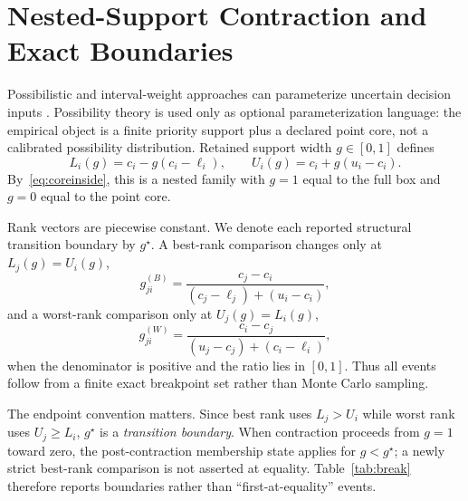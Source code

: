 \documentclass[conference]{IEEEtran}
\begin{document}
\section{Nested-Support Contraction and Exact Boundaries}
Possibilistic and interval-weight approaches can parameterize uncertain decision inputs \cite{kasperski2010,dubois2016}. Possibility theory is used only as optional parameterization language: the empirical object is a finite priority support plus a declared point core, not a calibrated possibility distribution. Retained support width $g\in[0,1]$ defines
\begin{equation}
L_i(g)=c_i-g(c_i-\ell_i),\qquad U_i(g)=c_i+g(u_i-c_i).
\label{eq:contract}
\end{equation}
By~\eqref{eq:coreinside}, this is a nested family with $g=1$ equal to the full box and $g=0$ equal to the point core.

Rank vectors are piecewise constant. We denote each reported structural transition boundary by $g^\star$. A best-rank comparison changes only at $L_j(g)=U_i(g)$,
\begin{equation}
g_{ji}^{(B)}=\frac{c_j-c_i}{(c_j-\ell_j)+(u_i-c_i)},
\end{equation}
and a worst-rank comparison only at $U_j(g)=L_i(g)$,
\begin{equation}
g_{ji}^{(W)}=\frac{c_i-c_j}{(u_j-c_j)+(c_i-\ell_i)},
\end{equation}
when the denominator is positive and the ratio lies in $[0,1]$. Thus all events follow from a finite exact breakpoint set rather than Monte Carlo sampling.

\begin{table}[t]
\caption{Reported Top-25 structural contraction boundaries.}
\label{tab:break}
\centering\small
{}
\end{table}

The endpoint convention matters. Since best rank uses $L_j>U_i$ while worst rank uses $U_j\ge L_i$, $g^\star$ is a \emph{transition boundary}. When contraction proceeds from $g=1$ toward zero, the post-contraction membership state applies for $g<g^\star$; a newly strict best-rank comparison is not asserted at equality. Table~\ref{tab:break} therefore reports boundaries rather than ``first-at-equality'' events.
\end{document}
